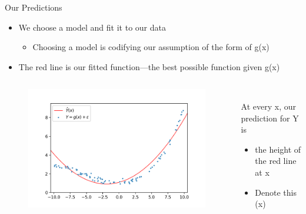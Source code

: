 \documentclass[aspectratio=169]{../latex_main/tntbeamer}  %
\begin{document}
	
	\begin{frame}{Our Predictions}
	    \begin{itemize}
	        \item We choose a model and fit it to our data
	        \begin{itemize}
	            \item Choosing a model is codifying our assumption of the form of g(x)
	        \end{itemize}
	        \item The red line is our fitted function—the best possible function given g(x)
	    \end{itemize}
	    \begin{columns}
	        \begin{column}{.4\textwidth}
	                \begin{figure}
	                    \includegraphics[scale=.5]{Bild3}
	                \end{figure}
	        \end{column}
	        
	        
	         \begin{column}{.4\textwidth}
	         \\ \bigskip
	         \bigskip
	               At every x, our prediction for Y is
	                \begin{itemize}
	                    \item the height of the red line at x
	                    \item Denote this  (x)
	                \end{itemize}
	        \end{column}
	    \end{columns}
	\end{frame}
	
\end{document}
